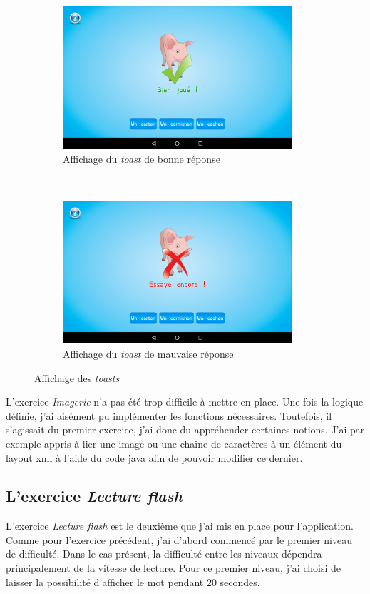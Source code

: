 \begin{figure}[H]
\begin{subfigure}[t]{8.5cm}
\includegraphics[width=8.5cm]{img/img-ok.png}
\caption{Affichage du \textit{toast} de bonne réponse}
\label{toastOk}
\end{subfigure}
~
\begin{subfigure}[t]{8.5cm}
\includegraphics[width=8.5cm]{img/img-ko.png}
\caption{Affichage du \textit{toast} de mauvaise réponse}
\label{toastKo}
\end{subfigure}
\caption{Affichage des \textit{toasts}}
\end{figure}

L'exercice \textit{Imagerie} n'a pas été trop difficile à mettre en place. Une fois la logique définie, j'ai aisément pu implémenter les fonctions nécessaires. Toutefois, il s'agissait du premier exercice, j'ai donc du appréhender certaines notions. J'ai par exemple appris à lier une image ou une chaîne de caractères à un élément du layout xml à l'aide du code java afin de pouvoir modifier ce dernier.

\subsection{L'exercice \textit{Lecture flash}}
L'exercice \textit{Lecture flash} est le deuxième que j'ai mis en place pour l'application. Comme pour l'exercice précédent, j'ai d'abord commencé par le premier niveau de difficulté. Dans le cas présent, la difficulté entre les niveaux dépendra principalement de la vitesse de lecture. Pour ce premier niveau, j'ai choisi de laisser la possibilité d'afficher le mot pendant 20 secondes.\\

